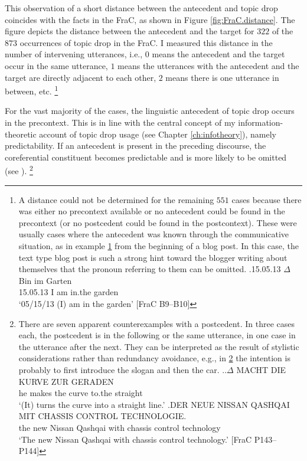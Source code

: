 \largerpage[-2]
This observation of a short distance between the antecedent and topic drop coincides with the facts in the FraC, as shown in Figure \ref{fig:FraC.distance}.
The figure depicts the distance between the antecedent and the target for $322$ of the $873$ occurrences of topic drop in the FraC.
I measured this distance in the number of intervening utterances, i.e., $0$ means the antecedent and the target occur in the same utterance, $1$ means the utterances with the antecedent and the target are directly adjacent to each other, $2$ means  there is one utterance in between, etc.%
\footnote{A distance could not be determined for the remaining $551$ cases because there was either no precontext available or no antecedent could be found in the precontext (or no postcedent could be found in the postcontext).
These were usually cases where the antecedent was known through the communicative situation, as in example \ref{ex:situation.antecedent} from the beginning of a blog post.
In this case, the text type blog post is such a strong hint toward the blogger writing about themselves that the pronoun referring to them can be omitted.
\exg.\label{ex:situation.antecedent}15.05.13 $\Delta$ Bin im Garten\\
15.05.13 I am in.the garden \\
`05/15/13 (I) am in the garden' [FraC B9--B10]

}

For the vast majority of the cases, the linguistic antecedent of topic drop occurs in the precontext.
This is in line with the central concept of my information-theoretic account of topic drop usage (see Chapter \ref{ch:infotheory}), namely predictability. 
If an antecedent is present in the preceding discourse, the coreferential constituent becomes predictable  and is more likely to be omitted (see ).%
\footnote{There are seven apparent counterexamples with a postcedent.
In three cases each, the postcedent is in the following or the same utterance, in one case in the utterance after the next.
They can be interpreted as the result of stylistic considerations rather than redundancy avoidance, e.g., in \ref{ex:postcedent} the intention is probably to first introduce the slogan and then the car.
\ex.\label{ex:postcedent}\ag.$\Delta$ MACHT DIE KURVE ZUR GERADEN \\
he makes the curve to.the straight \\
`(It) turns the curve into a straight line.'
\bg.DER NEUE NISSAN QASHQAI MIT CHASSIS CONTROL TECHNOLOGIE.\\
the new Nissan Qashqai with chassis control technology\\
`The new Nissan Qashqai with chassis control technology.' [FraC P143--P144]

}
%

